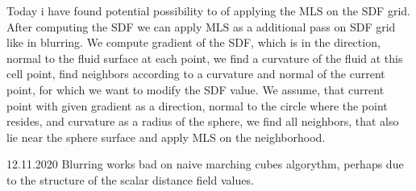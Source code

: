 Today i have found potential possibility to of applying the MLS on the SDF grid. After computing the SDF we can apply MLS as a additional pass on SDF grid like in blurring. We compute gradient of the SDF, which is in the direction, normal to the fluid surface at each point, we find a curvature of the fluid at this cell point, find neighbors according to a curvature and normal of the current point, for which we want to modify the SDF value. We assume, that current point with given gradient as a direction, normal to the circle where the point resides, and curvature as a radius of the sphere, we find all neighbors, that also lie near the sphere surface and apply MLS on the neighborhood.

12.11.2020
Blurring works bad on naive marching cubes algorythm, perhaps due to the structure of the scalar distance field values.

